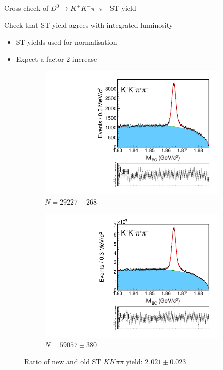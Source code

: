 \documentclass{beamer}
\begin{document}
\begin{frame}{Cross check of $D^0\to K^+K^-\pi^+\pi^-$ ST yield}
  \begin{center}
    {\large Check that ST yield agrees with integrated luminosity}
  \end{center}
  \vspace{0.1cm}
  \begin{itemize}
    \item{ST yields used for normalisation}
    \item{Expect a factor $2$ increase}
  \end{itemize}
  \begin{figure}
    \centering
    \begin{subfigure}{0.4\textwidth}
      \includegraphics[width = 1.0\textwidth]{Plots/KKpipi_SingleTag_MBC_Plot_8invfb.pdf}
      \caption{$N = 29227 \pm 268$}
    \end{subfigure}%
    \hspace{1cm}
    \begin{subfigure}{0.4\textwidth}
      \includegraphics[width = 1.0\textwidth]{Plots/KKpipi_SingleTag_MBC_Plot_16invfb.pdf}
      \caption{$N = 59057 \pm 380$}
    \end{subfigure}
    \caption{Ratio of new and old ST $KK\pi\pi$ yield: $2.021 \pm 0.023$}
  \end{figure}
\end{frame}
\end{document}
